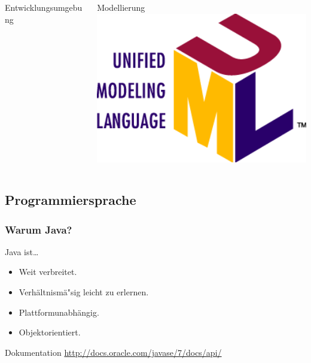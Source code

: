 \begin{frame}
\begin{columns}[T]
\begin{column}{.3\textwidth}
\begin{block}{Entwicklungsumgebung}
	    	\end{block}
	    \end{column}
	    \begin{column}{.3\textwidth}
	    	\begin{block}{Modellierung}
	    		\center
	    		\includegraphics[width=1\textwidth, keepaspectratio=true]{bilder/uml.png}
	    	\end{block}
	    \end{column}
	\end{columns}
\end{frame}
 
\subsection{Programmiersprache}
\begin{frame}
\frametitle{Warum Java?}
	\begin{block}{Java ist\ldots}
 		\begin{itemize}
		  \item Weit verbreitet.
		  \item Verh\"altnism\"a"sig leicht zu erlernen.
		  \item Plattformunabh\"angig.
		  \item Objektorientiert.
		\end{itemize} 
	\end{block}
	\begin{exampleblock}{Dokumentation}
		\url{http://docs.oracle.com/javase/7/docs/api/}
	\end{exampleblock}
\end{frame}
 
